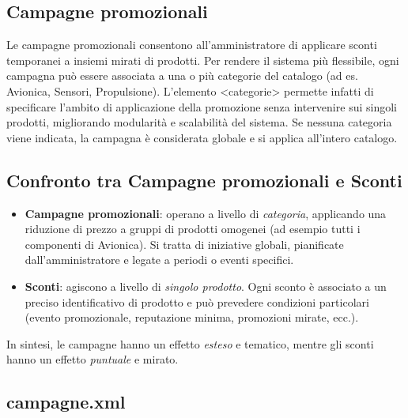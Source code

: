 \documentclass[a4paper,12pt]{report}
\begin{document}

\subsection*{Campagne promozionali}

Le campagne promozionali consentono all’amministratore di applicare sconti temporanei a insiemi mirati di prodotti.
Per rendere il sistema più flessibile, ogni campagna può essere associata a una o più categorie del catalogo (ad es. Avionica, Sensori, Propulsione).
L’elemento <categorie> permette infatti di specificare l’ambito di applicazione della promozione senza intervenire sui singoli prodotti, migliorando modularità e scalabilità del sistema.
Se nessuna categoria viene indicata, la campagna è considerata globale e si applica all’intero catalogo.

\subsection*{Confronto tra Campagne promozionali e Sconti}

\begin{itemize}
    \item \textbf{Campagne promozionali}: operano a livello di \textit{categoria},
    applicando una riduzione di prezzo a gruppi di prodotti omogenei
    (ad esempio tutti i componenti di Avionica). Si tratta di iniziative globali,
    pianificate dall’amministratore e legate a periodi o eventi specifici.

    \item \textbf{Sconti}: agiscono a livello di \textit{singolo prodotto}.
    Ogni sconto è associato a un preciso identificativo di prodotto e può prevedere
    condizioni particolari (evento promozionale, reputazione minima, promozioni mirate, ecc.).
\end{itemize}

\noindent In sintesi, le campagne hanno un effetto \textit{esteso} e tematico,
mentre gli sconti hanno un effetto \textit{puntuale} e mirato.


\subsection*{campagne.xml}
\end{document}
